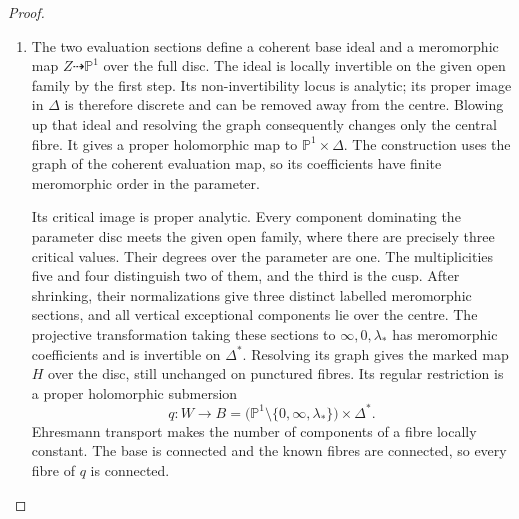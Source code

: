 \begin{proof}
\begin{enumerate}[label={$\langle1\rangle$\arabic*.}]
Put $\mathcal J=\omega_{Z/\Delta}^{-4}$.
The sheaves $R^jp_*\mathcal J$ are coherent
\cite[\S6, Hauptsatz I, p.~59]{Grauert60}.
Multiplication by a nonzero parameter germ is injective on
$\mathcal J$ and on $p_*\mathcal J$, so $p_*\mathcal J$ is locally free
over the disc and free after shrinking.
The exact sequence for a fibre over $t$ gives
\[
 0\longrightarrow(p_*\mathcal J)_t/\mathfrak m_t(p_*\mathcal J)_t
 \longrightarrow H^0(Z_t,\mathcal J_t)
 \longrightarrow
 \ker\bigl((t'-t): (R^1p_*\mathcal J)_t
                       \longrightarrow(R^1p_*\mathcal J)_t\bigr)
 \longrightarrow0.
\]
The last term is supported in the torsion support of the
coherent sheaf $R^1p_*\mathcal J$, a closed discrete analytic
set.  At a point of the given open family outside this support,
the displayed comparison shows that $p_*\mathcal J$ has rank
two.  Shrinking makes the support empty away from the centre.
Thus a frame of $p_*\mathcal J$ gives the complete two-dimensional
linear system on each punctured fibre.  

\item The two evaluation sections define a coherent base ideal and
a meromorphic map $Z\dashrightarrow\mathbb P^1$ over the full
disc.  The ideal is locally invertible on the given open family
by the first step.  Its non-invertibility locus is analytic;
its proper image in $\Delta$ is therefore discrete and can be
removed away from the centre.  Blowing up that ideal and
resolving the graph consequently changes only the central
fibre.  It gives a proper holomorphic map to
$\mathbb P^1\times\Delta$.  The construction uses the graph
of the coherent evaluation map, so its coefficients have
finite meromorphic order in the parameter.

Its critical image is proper analytic.  Every component
dominating the parameter disc meets the given open family,
where there are precisely three critical values.  Their
degrees over the parameter are one.  The multiplicities five
and four distinguish two of them, and the third is the cusp.
After shrinking, their normalizations give three distinct
labelled meromorphic sections, and all vertical exceptional
components lie over the centre.  The projective transformation
taking these sections to $\infty,0,\lambda_*$ has meromorphic
coefficients and is invertible on $\Delta^*$.  Resolving its
graph gives the marked map $H$ over the disc, still
unchanged on punctured fibres.  Its regular restriction is a
proper holomorphic submersion
\[
 q:W\longrightarrow
 B=\bigl(\mathbb P^1\setminus\{0,\infty,\lambda_*\}\bigr)
          \times\Delta^*.
\]
Ehresmann transport makes the number of components of a fibre
locally constant.  The base is connected and the known fibres
are connected, so every fibre of $q$ is connected.


\end{enumerate}
\end{proof}
